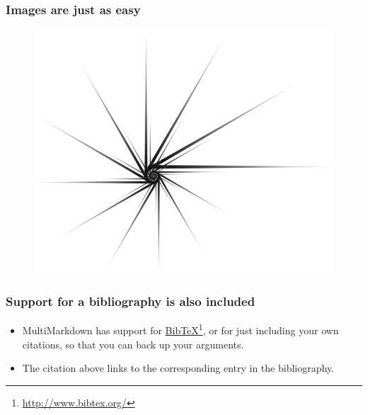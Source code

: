 \begin{frame}

\frametitle{Images are just as easy}
\label{imagesarejustaseasy}

\begin{figure}[htbp]
\centering
\includegraphics[keepaspectratio,width=\textwidth,height=0.75\textheight]{Nautilus_Star.png}
\label{}
\end{figure}


\end{frame}

\begin{frame}

\frametitle{Support for a bibliography is also included}
\label{supportforabibliographyisalsoincluded}

\begin{itemize}
\item MultiMarkdown has support for \href{http://www.bibtex.org/}{BibTeX}\footnote{\href{http://www.bibtex.org/}{http:\slash \slash www.bibtex.org\slash }}, or
 for just including your own citations, so that you can back up your
 arguments.~\cite[p. 42]{fake}

\item The citation above links to the corresponding entry in the bibliography.

\end{itemize}

\end{frame}


